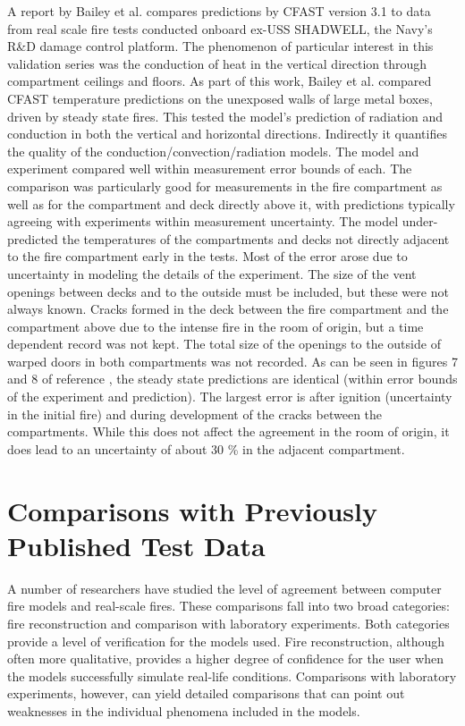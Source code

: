 A report by Bailey et al. \cite{Valid:Bailey_Shadwell} compares predictions by CFAST version 3.1 to data from real scale fire tests conducted onboard ex-USS SHADWELL, the {Navy's} R\&D damage control platform. The phenomenon of particular interest in this validation series was the conduction of heat in the vertical direction through compartment ceilings and floors. As part of this work, Bailey et al. \cite{Valid:Bailey_Vertical_Heat} compared CFAST temperature predictions on the unexposed walls of large metal boxes, driven by steady state fires. This tested the model's prediction of radiation and conduction in both the vertical and horizontal directions. Indirectly it quantifies the quality of the conduction/convection/radiation models. The model and experiment compared well within measurement error bounds of each. The comparison was particularly good for measurements in the fire compartment as well as for the compartment and deck directly above it, with predictions typically agreeing with experiments within measurement uncertainty. The model under-predicted the temperatures of the compartments and decks not directly adjacent to the fire compartment early in the tests. Most of the error arose due to uncertainty in modeling the details of the experiment. The size of the vent openings between decks and to the outside must be included, but these were not always known. Cracks formed in the deck between the fire compartment and the compartment above due to the intense fire in the room of origin, but a time dependent record was not kept. The total size of the openings to the outside of warped doors in both compartments was not recorded. As can be seen in figures 7 and 8 of reference \cite{Valid:Bailey_Shadwell}, the steady state predictions are identical (within error bounds of the experiment and prediction). The largest error is after ignition (uncertainty in the initial fire) and during development of the cracks between the compartments. While this does not affect the agreement in the room of origin, it does lead to an uncertainty of about 30 \% in the adjacent compartment.

\section{Comparisons with Previously Published Test Data}

A number of researchers have studied the level of agreement between computer fire models and
real-scale fires. These comparisons fall into two broad categories: fire reconstruction and
comparison with laboratory experiments. Both categories provide a level of verification for the
models used. Fire reconstruction, although often more qualitative, provides a higher degree of
confidence for the user when the models successfully simulate real-life conditions. Comparisons
with laboratory experiments, however, can yield detailed comparisons that can point out
weaknesses in the individual phenomena included in the models.

